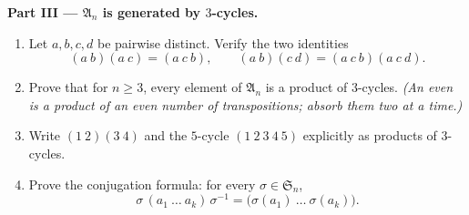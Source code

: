 \begin{problem}
\medskip
\noindent\textbf{Part III --- $\mathfrak A_n$ is generated by
$3$-cycles.}
\begin{enumerate}[resume]
  \item Let $a, b, c, d$ be pairwise distinct. Verify the two
        identities
        \[
        (a\ b)(a\ c) = (a\ c\ b),
        \qquad
        (a\ b)(c\ d) = (a\ c\ b)(a\ c\ d) .
        \]
  \item Prove that for $n \geq 3$, every element of $\mathfrak
        A_n$ is a product of $3$-cycles. \emph{(An even
         is a product of an even number of
        transpositions; absorb them two at a time.)}
  \item Write $(1\ 2)(3\ 4)$ and the $5$-cycle $(1\ 2\ 3\ 4\ 5)$
        explicitly as products of $3$-cycles.
  \item Prove the conjugation formula: for every $\sigma \in
        \mathfrak S_n$,
        \[
        \sigma\,(a_1\ \dots\ a_k)\,\sigma^{-1}
        = \bigl(\sigma(a_1)\ \dots\ \sigma(a_k)\bigr) .
        \]
\end{enumerate}


\end{problem}
